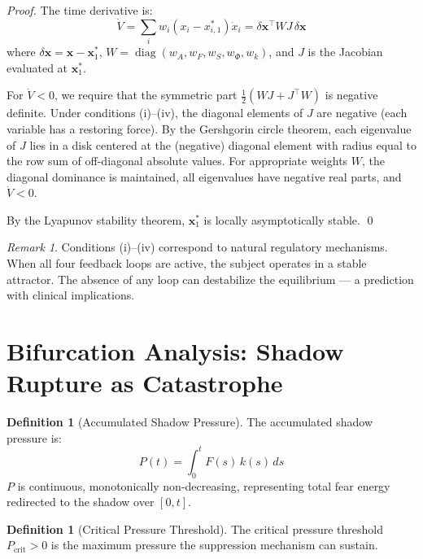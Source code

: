 \documentclass[12pt,a4paper]{article}
\theoremstyle{plain}
\theoremstyle{definition}
\newtheorem{definition}[theorem]{Definition}
\theoremstyle{remark}
\newtheorem{remark}[theorem]{Remark}
\newcommand{\Pcrit}{P_{\mathrm{crit}}}
\begin{document}
\begin{proof}
The time derivative is:
\[
\dot{V} = \sum_i w_i(x_i - x_{i,1}^*)\dot{x}_i = \delta\mathbf{x}^\top W J\, \delta\mathbf{x}
\]
where $\delta\mathbf{x} = \mathbf{x} - \mathbf{x}_1^*$, $W = \operatorname{diag}(w_A, w_F, w_S, w_\Phi, w_k)$, and $J$ is the Jacobian evaluated at $\mathbf{x}_1^*$.

For $\dot{V} < 0$, we require that the symmetric part $\frac{1}{2}(WJ + J^\top W)$ is negative definite. Under conditions (i)--(iv), the diagonal elements of $J$ are negative (each variable has a restoring force). By the Gershgorin circle theorem, each eigenvalue of $J$ lies in a disk centered at the (negative) diagonal element with radius equal to the row sum of off-diagonal absolute values. For appropriate weights $W$, the diagonal dominance is maintained, all eigenvalues have negative real parts, and $\dot{V} < 0$.

By the Lyapunov stability theorem, $\mathbf{x}_1^*$ is locally asymptotically stable. \qed
\end{proof}

\begin{remark}
Conditions (i)--(iv) correspond to natural regulatory mechanisms. When all four feedback loops are active, the subject operates in a stable attractor. The absence of any loop can destabilize the equilibrium --- a prediction with clinical implications.
\end{remark}

\section{Bifurcation Analysis: Shadow Rupture as Catastrophe}

\begin{definition}[Accumulated Shadow Pressure]
The accumulated shadow pressure is:
\[
P(t) = \int_0^t F(s)\,k(s)\,ds
\]
$P$ is continuous, monotonically non-decreasing, representing total fear energy redirected to the shadow over $[0,t]$.
\end{definition}

\begin{definition}[Critical Pressure Threshold]
The critical pressure threshold $\Pcrit > 0$ is the maximum pressure the suppression mechanism can sustain.
\end{definition}
\end{document}
